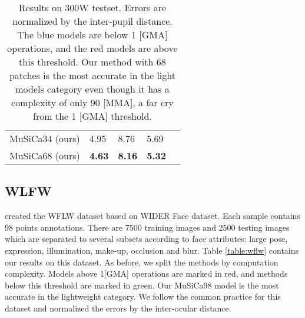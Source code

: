 \documentclass[9pt,twocolumn]{extarticle}
\begin{document}
\begin{table}[H]
{\begin{tabular}{@{}llllll@{}}
\multicolumn{2}{l}{MuSiCa34 (ours)}                     & 4.95                                 & 8.76                                 & 5.69                                 & \cellcolor[HTML]{0000FF} \\
\multicolumn{2}{l}{MuSiCa68 (ours)}               & {\textbf{4.63}} & {\textbf{8.16}} & {\textbf{5.32}} & \cellcolor[HTML]{0000FF}                        
\end{tabular}
}
\caption{Results on 300W testset. Errors are normalized by the inter-pupil distance. The blue models are below 1 [GMA] operations, and the red models are above this threshold. Our method with 68 patches is the most accurate in the light models category even though it has a complexity of only 90 [MMA], a far cry from the 1 [GMA] threshold.}\label{table:300w}

\end{table}



\subsection{WLFW}

\cite{wu2018look} created the WFLW dataset based on WIDER Face \cite{yang2016wider} dataset. Each sample contains 98 points annotations. There are 7500 training images and 2500 testing images which are separated to several subsets according to face attributes: large pose, expression, illumination, make-up, occlusion and blur. Table \ref{table:wflw} contains our results on this dataset. As before, we split the methods by computation complexity. Models above 1[GMA] operations are marked in red, and methods below this threshold are marked in green. Our MuSiCa98 model is the most accurate in the lightweight category. We follow the common practice for this dataset and normalized the errors by the inter-ocular distance.
\end{document}
